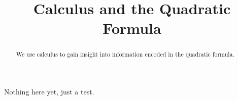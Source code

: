\documentclass{ximera}
\title{Calculus and the Quadratic Formula}
\begin{document}
\begin{abstract}
We use calculus to gain insight into information encoded in the quadratic formula.
\end{abstract}
\maketitle

Nothing here yet, just a test.
\end{document}
